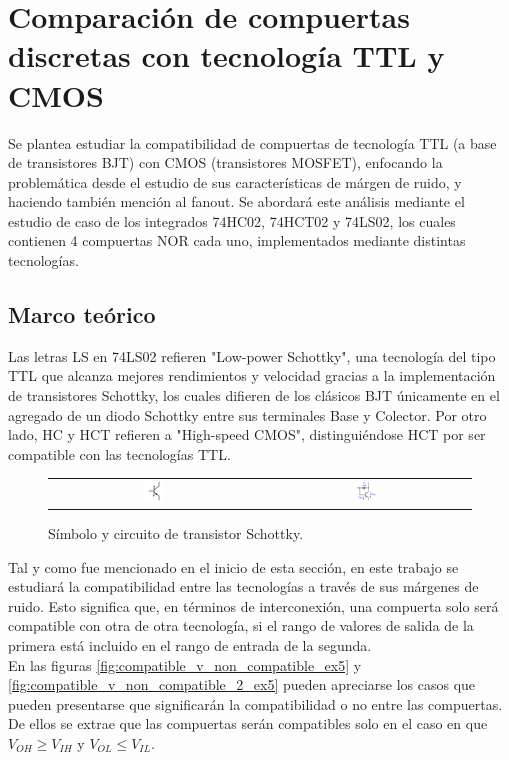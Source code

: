 \section{Comparaci\'on de compuertas discretas con tecnolog\'ia TTL y CMOS}
Se plantea estudiar la compatibilidad de compuertas de tecnología TTL (a base de transistores BJT) con CMOS (transistores MOSFET), enfocando la problemática desde el 
estudio de sus características de márgen de ruido, y haciendo también mención al fanout. 
Se abordará este análisis mediante el estudio de caso de los integrados 74HC02, 74HCT02 y 74LS02, los cuales contienen 4 compuertas NOR cada uno, implementados mediante 
distintas tecnologías.



\subsection{Marco teórico}
Las letras LS en 74LS02 refieren "Low-power Schottky", una tecnología del tipo TTL que alcanza mejores rendimientos y velocidad gracias a la implementación de 
transistores Schottky, los cuales difieren de los clásicos BJT únicamente en el agregado de un diodo Schottky entre sus terminales Base y Colector.
Por otro lado, HC y HCT refieren a "High-speed CMOS", distinguiéndose HCT por ser compatible con las tecnologías TTL.

\begin{figure}[H]
    \centering
    \begin{tabular}{c c}
        \includegraphics[width=0.1\textwidth]{../EJ2/Recursos/schottky_transistor_symbol} &
        \includegraphics[width=0.1\textwidth]{../EJ2/Recursos/schottky_transistor_circuit}
    \end{tabular}
    \caption{Símbolo y circuito de transistor Schottky.}
    \label{fig:schottky_transistor_symbol_and_circuit_ex5}
\end{figure}

Tal y como fue mencionado en el inicio de esta sección, en este trabajo se estudiará la compatibilidad entre las tecnologías a través de sus márgenes de ruido.
Esto significa que, en términos de interconexión, una compuerta solo será compatible con otra de otra tecnología, si el rango de valores de salida de la primera está 
incluido en el rango de entrada de la segunda. \\
En las figuras \ref{fig:compatible_v_non_compatible_ex5} y \ref{fig:compatible_v_non_compatible_2_ex5} pueden apreciarse los casos que pueden presentarse que significarán la compatibilidad o no entre las compuertas.
De ellos se extrae que las compuertas serán compatibles solo en el caso en que $V_{OH} \geq V_{IH}$ y $V_{OL} \leq V_{IL}$.

